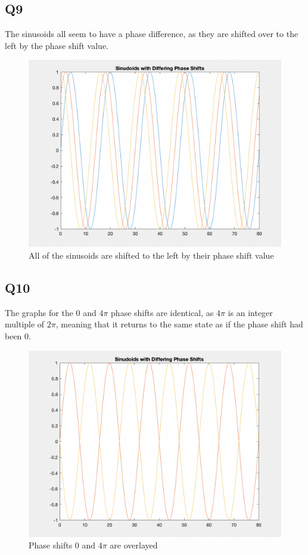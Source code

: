\documentclass[
	letterpaper, %
	10pt, %
]{CSUniSchoolLabReport}
\begin{document}
\subsection{Q9} The sinusoids all seem to have a phase difference, as they are shifted over to the left by the phase shift value.

\begin{figure}[H]
  \centering
  \includegraphics[width=.9\textwidth]{Figures/L7PS1.png}
  \caption{All of the sinusoids are shifted to the left by their phase shift value}
  \label{fig:2}
\end{figure}

\subsection{Q10} The graphs for the 0 and $4\pi$ phase shifts are identical, as $4\pi$ is an integer multiple of $2\pi$, meaning that it returns to the same state as if the phase shift had been 0.

\begin{figure}[H]
  \centering
  \includegraphics[width=.9\textwidth]{Figures/L7PS2.png}
  \caption{Phase shifts $0$ and $4\pi$ are overlayed}
  \label{fig:3}
\end{figure}
\end{document}
